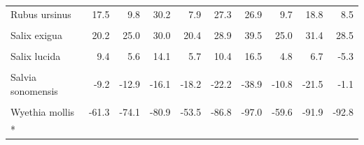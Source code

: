 \begin{longtable}[t]{lrrrrrrrrr}
Rubus ursinus & 17.5 & 9.8 & 30.2 & 7.9 & 27.3 & 26.9 & 9.7 & 18.8 & 8.5\\
\addlinespace
\cellcolor{gray!10}{Salix bebbiana} & \cellcolor{gray!10}{NA} & \cellcolor{gray!10}{NA} & \cellcolor{gray!10}{NA} & \cellcolor{gray!10}{NA} & \cellcolor{gray!10}{NA} & \cellcolor{gray!10}{NA} & \cellcolor{gray!10}{NA} & \cellcolor{gray!10}{NA} & \cellcolor{gray!10}{NA}\\
Salix exigua & 20.2 & 25.0 & 30.0 & 20.4 & 28.9 & 39.5 & 25.0 & 31.4 & 28.5\\
\cellcolor{gray!10}{Salix lasiolepis} & \cellcolor{gray!10}{20.9} & \cellcolor{gray!10}{19.9} & \cellcolor{gray!10}{15.9} & \cellcolor{gray!10}{14.7} & \cellcolor{gray!10}{16.3} & \cellcolor{gray!10}{15.6} & \cellcolor{gray!10}{15.9} & \cellcolor{gray!10}{15.0} & \cellcolor{gray!10}{-1.7}\\
Salix lucida & 9.4 & 5.6 & 14.1 & 5.7 & 10.4 & 16.5 & 4.8 & 6.7 & -5.3\\
\cellcolor{gray!10}{Salvia carduacea} & \cellcolor{gray!10}{25.2} & \cellcolor{gray!10}{41.3} & \cellcolor{gray!10}{46.1} & \cellcolor{gray!10}{42.5} & \cellcolor{gray!10}{62.3} & \cellcolor{gray!10}{45.2} & \cellcolor{gray!10}{65.1} & \cellcolor{gray!10}{39.2} & \cellcolor{gray!10}{-4.0}\\
\addlinespace
Salvia sonomensis & -9.2 & -12.9 & -16.1 & -18.2 & -22.2 & -38.9 & -10.8 & -21.5 & -1.1\\
\cellcolor{gray!10}{Taraxia tanacetifolia} & \cellcolor{gray!10}{-57.4} & \cellcolor{gray!10}{-87.5} & \cellcolor{gray!10}{-86.5} & \cellcolor{gray!10}{-53.4} & \cellcolor{gray!10}{-82.3} & \cellcolor{gray!10}{-76.4} & \cellcolor{gray!10}{-81.2} & \cellcolor{gray!10}{-86.2} & \cellcolor{gray!10}{-61.9}\\
Wyethia mollis & -61.3 & -74.1 & -80.9 & -53.5 & -86.8 & -97.0 & -59.6 & -91.9 & -92.8\\*
\end{longtable}
\endgroup{}
